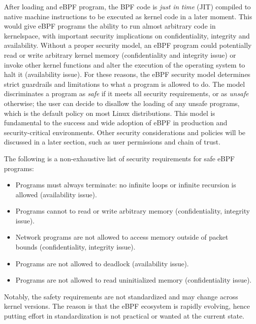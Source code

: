 After loading and eBPF program, the BPF code is \textit{just in time} (JIT)
compiled to native machine instructions to be executed as kernel code in a later
moment. This would give eBPF programs the ability to run almost arbitrary code
in kernelspace, with important security implications on confidentiality,
integrity and availability. Without a proper security model, an eBPF program
could potentially read or write arbitrary kernel memory (confidentiality and
integrity issue) or invoke other kernel functions and alter the execution of the
operating system to halt it (availability issue). For these reasons, the eBPF
security model determines strict guardrails and limitations to what a program is
allowed to do. The model discriminates a program as \textit{safe} if it meets
all security requirements, or as \textit{unsafe} otherwise; the user can decide
to disallow the loading of any unsafe programs, which is the default policy on
most Linux distributions. This model is fundamental to the success and wide
adoption of eBPF in production and security-critical environments. Other
security considerations and policies will be discussed in a later section, such
as user permissions and chain of trust.


The following is a non-exhaustive list of security requirements for safe eBPF
programs:

\begin{itemize}

  \item Programs must always terminate: no infinite loops or infinite recursion
    is allowed (availability issue).

  \item Programs cannot to read or write arbitrary memory (confidentiality,
    integrity issue).

  \item Network programs are not allowed to access memory outside of packet
    bounds (confidentiality, integrity issue).

  \item Programs are not allowed to deadlock (availability issue).

  \item Programs are not allowed to read uninitialized memory (confidentiality
    issue).

\end{itemize}

Notably, the safety requirements are not standardized and may change across
kernel versions. The reason is that the eBPF ecosystem is rapidly evolving,
hence putting effort in standardization is not practical or wanted at the
current state.

